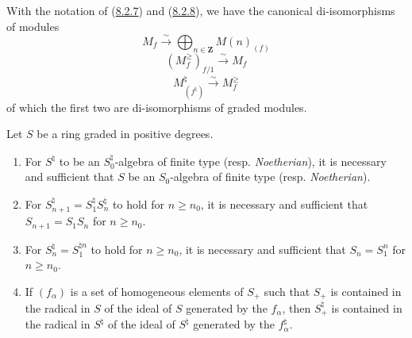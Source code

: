 \begin{lemma}[8.2.9]
\label{II.8.2.9}
With the notation of \textup{(\hyperref[II.8.2.7]{8.2.7})} and
\textup{(\hyperref[II.8.2.8]{8.2.8})}, we have the canonical di-isomorphisms of
modules
\begin{equation}
\label{II.8.2.9.1}
  M_f\xrightarrow{\sim}\bigoplus_{n\in\mathbf{Z}}M(n)_{(f)}
\tag{8.2.9.1}
\end{equation}
\begin{equation}
\label{II.8.2.9.2}
  (M_f^{\geq})_{f/1}\xrightarrow{\sim}M_f
\tag{8.2.9.2}
\end{equation}
\begin{equation}
\label{II.8.2.9.3}
  M^\natural_{(f^\natural)}\xrightarrow{\sim}M_f^{\geq}
\tag{8.2.9.3}
\end{equation}
of which the first two are di-isomorphisms of graded modules.
\end{lemma}

\begin{lemma}[8.2.10]
\label{II.8.2.10}
Let $S$ be a ring graded in positive degrees.
\begin{enumerate}
\item[\rm(i)] For $S^\natural$ to be an $S_0^\natural$-algebra of finite
type \textup{(resp. \emph{Noetherian})}, it is necessary and sufficient that $S$ be an $S_0$-algebra
of finite type \textup{(resp. \emph{Noetherian})}.
\item[\rm(ii)] For $S_{n+1}^\natural=S_1^\natural S_n^\natural$ to hold for
$n\geq n_0$, it is necessary and sufficient that $S_{n+1}=S_1S_n$ for $n\geq n_0$.
\item[\rm(iii)] For $S_n^\natural=S_1^{\natural n}$ to hold for $n\geq n_0$, it
is necessary and sufficient that $S_n=S_1^n$ for $n\geq n_0$.
\item[\rm(iv)] If $(f_\alpha)$ is a set of homogeneous elements of $S_+$
such that $S_+$ is contained in the radical in $S$ of the ideal of $S$ generated by
the $f_\alpha$, then $S_+^\natural$ is contained in the radical in $S^\natural$ of
the ideal of $S^\natural$ generated by the $f_\alpha^\natural$.
\end{enumerate}
\end{lemma}

